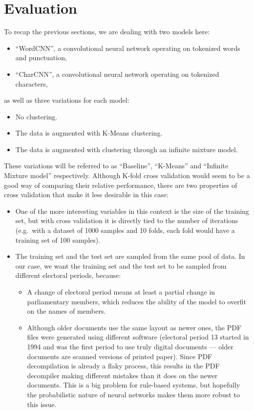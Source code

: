 \section{Evaluation}
\FloatBarrier%

To recap the previous sections, we are dealing with two models here:
\begin{itemize}
  \item ``WordCNN'', a convolutional neural network operating on tokenized words
    and punctuation,
  \item ``CharCNN'', a convolutional neural network operating on tokenized
    characters,
\end{itemize}
as well as three variations for each model:
\begin{itemize}
  \item No clustering.
  \item The data is augmented with K-Means clustering.
  \item The data is augmented with clustering through an infinite mixture model.
\end{itemize}
These variations will be referred to as ``Baseline'', ``K-Means'' and ``Infinite
Mixture model'' respectively. Although K-fold cross validation would seem to be
a good way of comparing their relative performance, there are two properties of
cross validation that make it less desirable in this case:
\begin{itemize}
  \item One of the more interesting variables in this context is the size of the
  training set, but
    with cross validation it is directly tied to the number of iterations (e.g.\
    with a dataset of 1000 samples and 10 folds, each fold would have a
    training set of 100 samples).
  \item The training set and the test set are sampled from the same pool of
    data. In our case, we want the training set and the test set to be sampled
    from different electoral periods, because:
    \begin{itemize}
      \item A change of electoral period means at least a partial change in
        parliamentary members, which reduces the ability of the model to 
        overfit on the names of members.
      \item Although older documents use the same layout as newer ones, the PDF
        files were generated using different software (electoral period 13 started
        in 1994 and was the first period to use truly  digital documents --- older
        documents are scanned versions of printed paper). Since PDF
        decompilation is already a flaky process, this results in the 
        PDF decompiler making different mistakes than it does on the newer
        documents. This is a big problem for rule-based systems, but hopefully the
        probabilistic nature of neural networks makes them more robust to this issue.
    \end{itemize}
\end{itemize}

